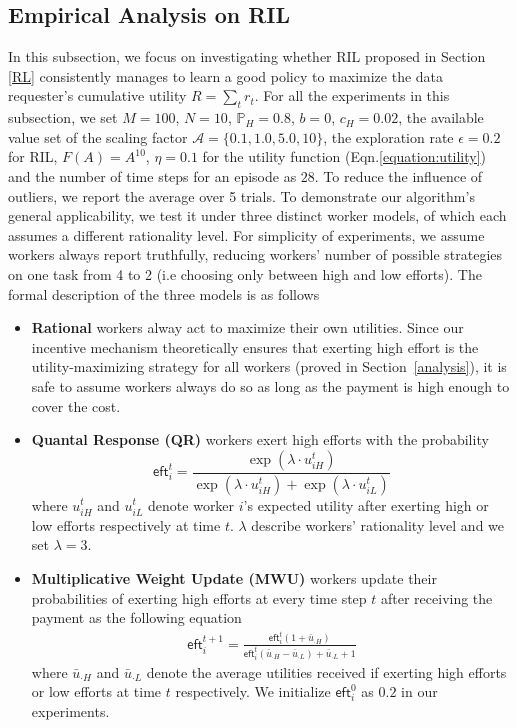 \subsection{Empirical Analysis on RIL}
In this subsection, we focus on investigating whether RIL proposed in Section \ref{RL} consistently manages to learn a good policy to maximize the data requester's cumulative utility $R=\sum_t r_t$.  For all the experiments in this subsection, we set $M=100$, $N=10$, $\mathbb{P}_H=0.8$, $b=0$, $c_H=0.02$, the available value set of the scaling factor $\mathcal{A}=\{0.1,1.0,5.0,10\}$, the exploration rate $\epsilon = 0.2$ for RIL, $F(A)=A^{10}$, $\eta=0.1$ for the utility function (Eqn.\ref{equation:utility}) and the number of time steps for an episode as $28$. To reduce the influence of outliers, we report the average over 5 trials. To demonstrate our algorithm's general applicability, we test it under three distinct worker models, of which each assumes a different rationality level.
For simplicity of experiments, we assume workers always report truthfully,  reducing workers' number of possible strategies on one task from 4 to 2 (i.e choosing only between high and low efforts). 
The formal description of the three models is as follows
\begin{itemize}[topsep=0pt, partopsep=0pt]
\item {\bf Rational} workers alway act to maximize their own utilities. Since our incentive mechanism theoretically ensures that exerting high effort %
is the utility-maximizing strategy for all workers (proved in Section~\ref{analysis}), it is safe to assume workers always do so as long as the payment is high enough to cover the cost.
\item {\bf Quantal Response (QR)} workers \citep{mckelvey1995quantal} exert high efforts with the probability 
$$
\textsf{eft}_i^t= \frac{\exp(\lambda\cdot  u_{iH}^t)}{\exp(\lambda \cdot u_{iH}^t) + \exp (\lambda \cdot u_{iL}^t)}
$$
where $u_{iH}^t$ and $u_{iL}^t$ denote worker $i$'s expected utility after exerting high or low efforts respectively at time $t$. $\lambda$ describe workers' rationality level and we set $\lambda =3$.

\item {\bf Multiplicative Weight Update (MWU)} workers \citep{chastain2014algorithms} update their probabilities of exerting high efforts at every time step $t$ after receiving the payment as the following equation
\begin{align*}
\textsf{eft}_i^{t+1} = \frac{\textsf{eft}_i^t(1+\bar{u}_{\cdot H})}{\textsf{eft}_i^t(\bar{u}_{\cdot H} - \bar{u}_{\cdot L}) + \bar{u}_{\cdot L} + 1}
\end{align*}
where $\bar{u}_{\cdot H}$ and $\bar{u}_{\cdot L}$ denote the average utilities received if exerting high efforts or low efforts at time $t$ respectively. We initialize $\textsf{eft}_i^0$ as $0.2$ in our experiments.
\end{itemize}

